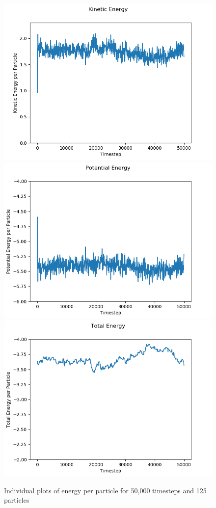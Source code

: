 \documentclass{article}
\begin{document}
 	\begin{figure}[H]
				\centering
				\includegraphics[scale=0.5]{kin_energy_b}
				\includegraphics[scale=0.5]{pot_energy_b}
				\includegraphics[scale=0.5]{tot_energy_b}
				\caption{Individual plots of energy per particle for 50,000 timesteps and 125 particles}
	\end{figure}
\end{document}
